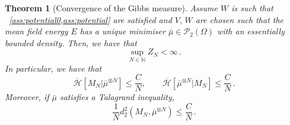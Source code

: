 \documentclass[a4paper,10pt,twoside]{amsart}
\newtheorem{theorem}{Theorem}[section]
\theoremstyle{remark}
\theoremstyle{definition}
\numberwithin{equation}{section}
\newcommand{\N}{\mathbb{N}}
\newcommand{\cP}{\mathcal{P}}
\newcommand{\0}{{\bf 0}}
\newcommand{\+}{\hspace{-.5ex}+\hspace{-.5ex}}
\begin{document}
\begin{theorem}[Convergence of the Gibbs measure]\label{thm:Gibbsconvergence}
  Assume $W$ is such that ~\cref{ass:potential0,ass:potential} are satisfied and $V,\,W$ are chosen such that the mean field energy $E$ has a unique minimiser $\bar{\mu} \in \cP_2(\Omega)$ with an essentially bounded density. Then, we have that
    \begin{equation}
    \sup_{N \in \N} Z_{N} < \infty \, .
  \end{equation}
    In particular, we have that
    \begin{equation}
    \overline{\mathcal{H}}[M_N|\bar{\mu}^{\otimes N}] \le \frac{C}{N}, \qquad \overline{\mathcal{H}}[\bar{\mu}^{\otimes N}|M_N]\le \frac{C}{N} \, .
  \end{equation}
  Moreover, if $\bar{\mu}$ satisfies a Talagrand inequality, 
  \begin{equation}
    \frac{1}{N}d_2^2(M_N,\bar{\mu}^{\otimes N})\le \frac{C}{N} \, .
  \end{equation}
\end{theorem}














\appendix
\appendix
\end{document}
